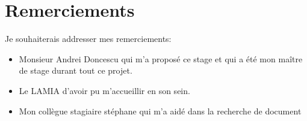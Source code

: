 \chapter{Remerciements}\label{Remerciements}
Je souhaiterais addresser mes remerciements:
\begin{itemize}
  \item Monsieur Andrei Doncescu qui m'a proposé ce stage et qui a été mon maître de stage durant tout ce projet.
  \item Le LAMIA d'avoir pu m'accueillir en son sein.
  \item Mon collègue stagiaire stéphane qui m'a aidé dans la recherche de document
\end{itemize}
